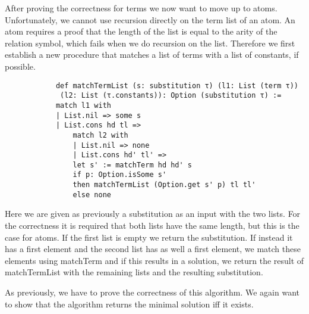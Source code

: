 \documentclass{article}
\begin{document}
        After proving the correctness for terms we now want to move up to atoms. Unfortunately, we cannot use recursion directly on the term list of an atom. An atom requires a proof that the length of the list is equal to the arity of the relation symbol, which fails when we do recursion on the list. Therefore we first establish a new procedure that matches a list of terms with a list of constants, if possible.
        
        \begin{lstlisting}
            def matchTermList (s: substitution τ) (l1: List (term τ))
             (l2: List (τ.constants)): Option (substitution τ) :=
            match l1 with
            | List.nil => some s
            | List.cons hd tl =>
                match l2 with
                | List.nil => none
                | List.cons hd' tl' =>
                let s' := matchTerm hd hd' s
                if p: Option.isSome s'
                then matchTermList (Option.get s' p) tl tl'
                else none
        \end{lstlisting}

        Here we are given as previously a substitution as an input with the two lists. For the correctness it is required that both lists have the same length, but this is the case for atoms. If the first list is empty we return the substitution. If instead it has a first element and the second list has as well a first element, we match these elements using matchTerm and if this results in a solution, we return the result of matchTermList with the remaining lists and the resulting substitution.

        As previously, we have to prove the correctness of this algorithm. We again want to show that the algorithm returns the minimal solution iff it exists.
\end{document}
